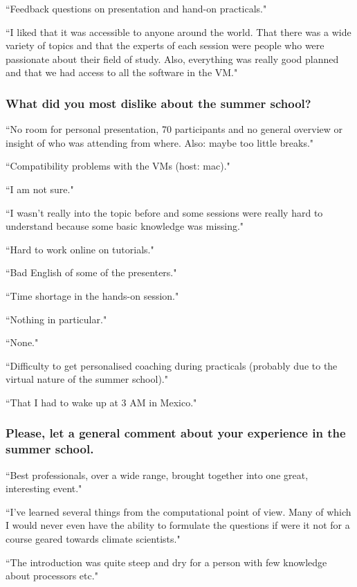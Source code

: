 ``Feedback questions on presentation and hand-on practicals."

``I liked that it was accessible to anyone around the world. That there was a wide variety of topics and that the experts of each session were people who were passionate about their field of study. Also, everything was really good planned and that we had access to all the software in the VM."

\subsubsection{What did you most dislike about the summer school?}

``No room for personal presentation, 70 participants and no general overview or insight of who was attending from where. Also: maybe too little breaks."

``Compatibility problems with the VMs (host: mac)."

``I am not sure."

``I wasn't really into the topic before and some sessions were really hard to understand because some basic knowledge was missing."

``Hard to work online on tutorials."

``Bad English of some of the presenters."

``Time shortage in the hands-on session."

``Nothing in particular."

``None."

``Difficulty to get personalised coaching during practicals (probably due to the virtual nature of the summer school)."

``That I had to wake up at 3 AM in Mexico."

\subsubsection{Please, let a general comment about your experience in the summer school.}

``Best professionals, over a wide range, brought together into one great, interesting event."

``I've learned several things from the computational point of view. Many of which I would never even have the ability to formulate the questions if were it not for a course geared towards climate scientists."

``The introduction was quite steep and dry for a person with few knowledge about processors etc."

